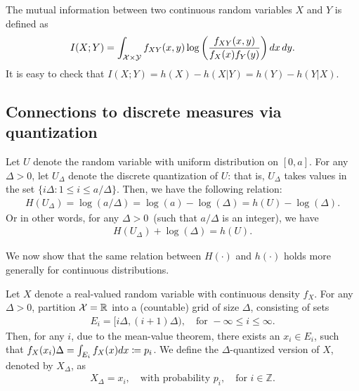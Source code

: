        \begin{definition}
            \label{def:mi-cont}
            The mutual information between two continuous random variables $X$ and $Y$ is defined as 
            \begin{align}
                I(X;Y) = \int_{\mathcal{X} \times \mathcal{Y}} f_{XY}(x, y) \log \left( \frac{ f_{XY}(x, y)}{f_X(x) f_Y(y)} \right) dx\, dy. 
            \end{align}
            It is easy to check that $I(X;Y) = h(X) - h(X|Y) = h(Y) - h(Y|X)$. 
        \end{definition}

        \subsection{Connections to discrete measures via quantization} 
            \label{subsec:info-measures-quantization} 

            \begin{example}
                Let $U$ denote the random variable with uniform distribution on $[0, a]$. For any $\Delta >0$, let $U_\Delta$ denote the discrete quantization of $U$: that is, $U_\Delta$ takes values in the set $\{i\Delta: 1 \leq i \leq a/\Delta\}$.  Then, we have the following relation: 
                \begin{align}
                    H(U_\Delta) = \log(a/\Delta) = \log (a) - \log(\Delta) = h(U) - \log(\Delta). 
                \end{align}
                Or in other words, for any $\Delta>0$~(such that $a/\Delta$ is an integer), we have 
                \begin{align}
                    H(U_\Delta) + \log(\Delta) = h(U).  
                \end{align}
            \end{example}
            We now show that the same relation between $H(\cdot)$ and $h(\cdot)$ holds more generally for continuous distributions. 

            \begin{definition}
                \label{def:quantized-rv-1}
                Let $X$ denote a real-valued random variable with continuous density $f_X$. For any $\Delta>0$, partition $\mathcal{X} =\mathbb{R}$ into a (countable) grid of size $\Delta$, consisting of sets
                \begin{align}
                    E_i = [i\Delta, (i+1)\Delta), \quad \text{for } -\infty \leq i \leq \infty. 
                \end{align}
                Then, for any $i$, due to the mean-value theorem, there exists an $x_i \in E_i$, such that $f_X(x_i) \Delta = \int_{E_i} f_X(x) dx \coloneqq p_i$. We define the $\Delta$-quantized version of $X$, denoted by $X_\Delta$, as 
                \begin{align}
                    X_\Delta = x_i, \quad \text{with probability } p_i, \quad \text{for } i \in \mathbb{Z}. 
                \end{align}
            \end{definition}


